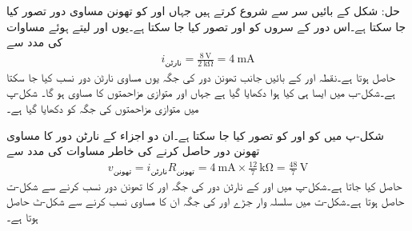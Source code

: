 حل: شکل  کے بائیں سر سے شروع کرتے ہیں جہاں  اور  کو تھونن مساوی دور تصور کیا جا سکتا ہے۔اس دور کے سروں کو  اور  تصور کیا جا سکتا ہے۔یوں  اور  لیتے ہوئے مساوات  کی مدد سے 
\begin{align*}
i_{\text{نارٹن}}=\frac{\SI{8}{\volt}}{\SI{2}{\kilo\ohm}}=\SI{4}{\milli\ampere}
\end{align*}
حاصل ہوتا ہے۔نقطہ  اور  کے بائیں جانب تھونن دور کی جگہ یوں مساوی نارٹن دور نسب کیا جا سکتا ہے۔شکل-ب میں ایسا ہی کیا ہوا دکھایا گیا ہے جہاں  اور  متوازی مزاحمتوں کا مساوی  ہو گا۔ شکل-پ میں متوازی مزاحمتوں کی جگہ  کو دکھایا گیا ہے۔

شکل-پ میں  کو  اور  کو  تصور کیا جا سکتا ہے۔ان دو اجزاء کے نارٹن دور کا مساوی تھونن دور حاصل کرنے کی خاطر مساوات  کی مدد سے 
\begin{align*}
v_{\text{تھونن}}=i_{\text{نارٹن}} R_{\text{تھونن}}=\SI{4}{\milli\ampere} \times \frac{12}{7} \, \si{\kilo\ohm}=\frac{48}{7} \, \si{\volt}
\end{align*}
حاصل کیا جاتا ہے۔شکل-پ میں   اور   کے نارٹن دور کی جگہ  اور  کا تھونن دور نسب کرنے سے شکل-ت حاصل ہوتا ہے۔شکل-ت میں سلسلہ وار جڑے  اور  کی جگہ ان کا مساوی  نسب کرنے سے شکل-ٹ حاصل ہوتا ہے۔

